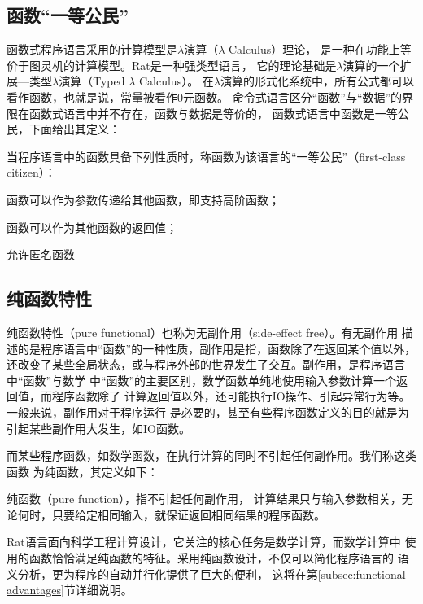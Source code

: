 \subsection{函数“一等公民”}
函数式程序语言采用的计算模型是$\lambda$演算（$\lambda$ Calculus）理论，
是一种在功能上等价于图灵机的计算模型。Rat是一种强类型语言，
它的理论基础是$\lambda$演算的一个扩展---类型$\lambda$演算（Typed $\lambda$ Calculus）。
在$\lambda$演算的形式化系统中，所有公式都可以看作函数，也就是说，常量被看作0元函数。
命令式语言区分“函数”与“数据”的界限在函数式语言中并不存在，函数与数据是等价的，
函数式语言中函数是一等公民，下面给出其定义：
\begin{definition}
  当程序语言中的函数具备下列性质时，称函数为该语言的“一等公民”（first-class citizen）：
  \begin{compactitem}
    \item 函数可以作为参数传递给其他函数，即支持高阶函数；
    \item 函数可以作为其他函数的返回值；
    \item 允许匿名函数
  \end{compactitem}
\end{definition}


\subsection{纯函数特性}
纯函数特性（pure functional）也称为无副作用（side-effect free）。有无副作用
描述的是程序语言中“函数”的一种性质，副作用是指，函数除了在返回某个值以外，
还改变了某些全局状态，或与程序外部的世界发生了交互。副作用，是程序语言中“函数”与数学
中“函数”的主要区别，数学函数单纯地使用输入参数计算一个返回值，而程序函数除了
计算返回值以外，还可能执行IO操作、引起异常行为等。一般来说，副作用对于程序运行
是必要的，甚至有些程序函数定义的目的就是为引起某些副作用大发生，如IO函数。

而某些程序函数，如数学函数，在执行计算的同时不引起任何副作用。我们称这类函数
为纯函数，其定义如下：
\begin{definition}
纯函数（pure function），指不引起任何副作用，
计算结果只与输入参数相关，无论何时，只要给定相同输入，就保证返回相同结果的程序函数。
\end{definition}

Rat语言面向科学工程计算设计，它关注的核心任务是数学计算，而数学计算中
使用的函数恰恰满足纯函数的特征。采用纯函数设计，不仅可以简化程序语言的
语义分析，更为程序的自动并行化提供了巨大的便利，
这将在第\ref{subsec:functional-advantages}节详细说明。


